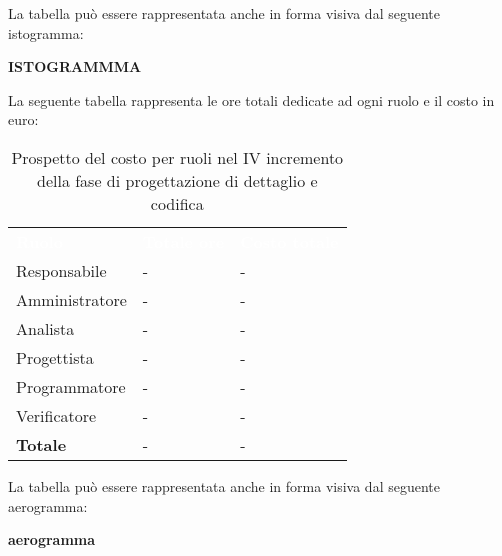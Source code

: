 La tabella può essere rappresentata anche in forma visiva dal seguente istogramma:

\textbf{ISTOGRAMMMA}


La seguente tabella rappresenta le ore totali dedicate ad ogni ruolo e il costo in euro:

\begin{table}[!htbp]
\begin{center}
\renewcommand{\arraystretch}{1.5}
\begin{tabular}{ m{}<{\centering}  m{}<{\centering} m{}<{\centering}}
	\rowcolor{darkblue}
	\textcolor{white}{\textbf{Ruolo}}&\textcolor{white}{\textbf{Totale ore}}&\textcolor{white}{\textbf{Costo totale}}\\ 

	Responsabile  & - & - \\	

	Amministratore & - & - \\
	
	Analista & - & - \\
	
	Progettista & - & - \\
	
	Programmatore & - & - \\
	
	Verificatore & - & - \\
	
	\textbf{Totale} & - & - \\
	
\end{tabular}
\caption{Prospetto del costo per ruoli nel IV incremento della fase di progettazione di dettaglio e codifica}
\end{center}
\end{table}

La tabella può essere rappresentata anche in forma visiva dal seguente aerogramma:

\textbf{aerogramma}


